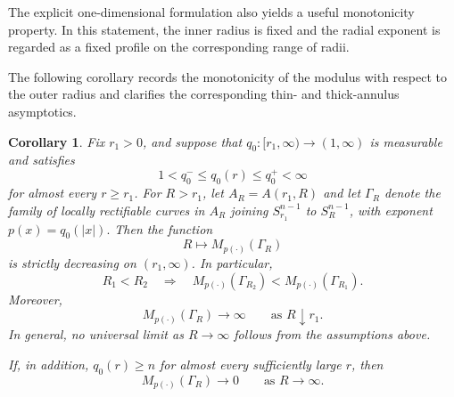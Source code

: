 \documentclass[12pt]{amsart}
\numberwithin{equation}{section}
\theoremstyle{plain}
\newtheorem{corollary}[equation]{Corollary}
\theoremstyle{definition}
\begin{document}
The explicit one-dimensional formulation also yields a useful monotonicity property. In this statement, the inner radius is fixed and the radial exponent is regarded as a fixed profile on the corresponding range of radii.

The following corollary records the monotonicity of the modulus with respect to the outer radius and clarifies the corresponding thin- and thick-annulus asymptotics.

\begin{corollary}
\label{cor:monotonicity}
Fix $r_1>0$, and suppose that $q_0:[r_1,\infty)\longrightarrow(1,\infty)$ is measurable and satisfies
\begin{equation*}
1<q_0^-\le q_0(r)\le q_0^+<\infty
\end{equation*}
for almost every $r\ge r_1$. For $R>r_1$, let $A_R=A(r_1,R)$ and let $\Gamma_R$ denote the family of locally rectifiable curves in $A_R$ joining $S_{r_1}^{n-1}$ to $S_R^{n-1}$, with exponent $p(x)=q_0(|x|).$ Then the function
\begin{equation*}
R\longmapsto M_{p(\cdot)}(\Gamma_R)
\end{equation*}
is strictly decreasing on $(r_1,\infty)$. In particular,
\begin{equation*}
R_1<R_2 \quad\Longrightarrow\quad M_{p(\cdot)}(\Gamma_{R_2}) < M_{p(\cdot)}(\Gamma_{R_1}).
\end{equation*}
Moreover,
\begin{equation}
\label{eq:thin_annulus_limit}
M_{p(\cdot)}(\Gamma_R)\longrightarrow\infty \qquad\text{as }R\downarrow r_1.
\end{equation}
In general, no universal limit as $R\to\infty$ follows from the assumptions above.

If, in addition, $q_0(r)\ge n$ for almost every sufficiently large $r$, then
\begin{equation}
\label{eq:thick_annulus_limit}
M_{p(\cdot)}(\Gamma_R)\longrightarrow0 \qquad\text{as }R\to\infty.
\end{equation}
\end{corollary}
\end{document}
